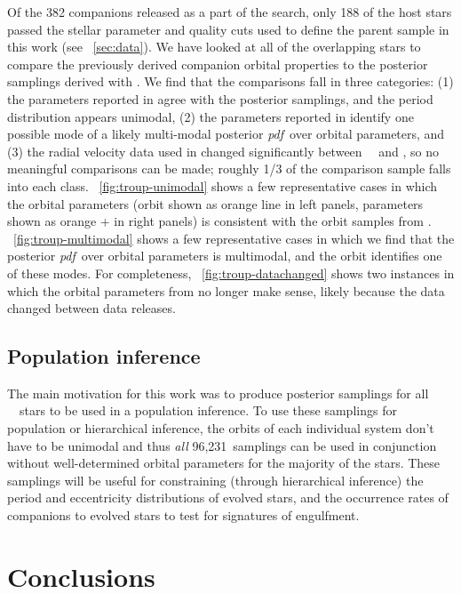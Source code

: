 \documentclass[modern, letterpaper]{aastex62}
\newcommand{\apogee}{\project{\acronym{APOGEE}}}
\newcommand{\thejoker}{\project{The~Joker}}
\newcommand{\DR}{\acronym{DR14}}
\newcommand{\DRtw}{\acronym{DR12}}
\newcommand{\pdf}{\textit{pdf}}
\newcommand{\nstars}{96,231}
\begin{document}
Of the 382 companions released as a part of the \citet{Troup:2016} search, only
188 of the host stars passed the stellar parameter and quality cuts used to
define the parent sample in this work (see \sectionname~\ref{sec:data}).
We have looked at all of the overlapping stars to compare the previously derived
companion orbital properties to the posterior samplings derived with \thejoker.
We find that the comparisons fall in three categories:
(1) the parameters reported in \citet{Troup:2016} agree with the posterior
samplings, and the period distribution appears unimodal,
(2) the parameters reported in \citet{Troup:2016} identify one possible mode of
a likely multi-modal posterior \pdf\ over orbital parameters, and
(3) the radial velocity data used in \citet{Troup:2016} changed significantly
between \apogee\ \DRtw\ and \DR, so no meaningful comparisons can be made;
roughly 1/3 of the comparison sample falls into each class.
\figurename~\ref{fig:troup-unimodal} shows a few representative cases in which
the \citet{Troup:2016} orbital parameters (orbit shown as orange line in left
panels, parameters shown as orange + in right panels) is consistent with the
orbit samples from \thejoker.
\figurename~\ref{fig:troup-multimodal} shows a few representative cases in which
we find that the posterior \pdf\ over orbital parameters is multimodal, and the
\citet{Troup:2016} orbit identifies one of these modes.
For completeness, \figurename~\ref{fig:troup-datachanged} shows two instances in
which the orbital parameters from \citet{Troup:2016} no longer make sense,
likely because the data changed between data releases.

\subsection{Population inference}

The main motivation for this work was to produce posterior samplings for all
\apogee\ \DR\ stars to be used in a population inference.
To use these samplings for population or hierarchical inference, the orbits of
each individual system don't have to be unimodal and thus \emph{all} \nstars\
samplings can be used in conjunction without well-determined orbital parameters
for the majority of the stars.
These samplings will be useful for constraining (through hierarchical inference)
the period and eccentricity distributions of evolved stars, and the occurrence
rates of companions to evolved stars to test for signatures of engulfment.

\section{Conclusions}
\end{document}
